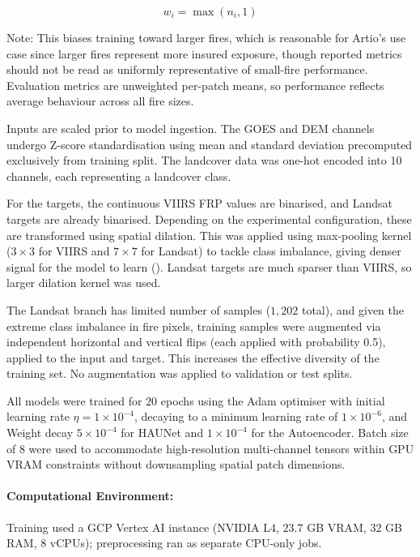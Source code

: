 \documentclass[a4paper, 11pt]{article} %
\begin{document}
\begin{equation}\label{eq:weighted_sampling}
    w_i = \max(n_i, 1)
\end{equation}

Note: This biases training toward larger fires, which is reasonable for Artio's use case since larger fires represent more insured exposure, though reported metrics should not be read as uniformly representative of small-fire performance. Evaluation metrics are unweighted per-patch means, so performance reflects average behaviour across all fire sizes.

Inputs are scaled prior to model ingestion. The GOES and DEM channels undergo Z-score standardisation using mean and standard deviation precomputed exclusively from training split. The landcover data was one-hot encoded into 10 channels, each representing a landcover class.

For the targets, the continuous VIIRS FRP values are binarised, and Landsat targets are already binarised. Depending on the experimental configuration, these are transformed using spatial dilation. This was applied using max-pooling kernel ($3 \times 3$ for VIIRS and $7 \times 7$ for Landsat) to tackle class imbalance, giving denser signal for the model to learn (\cite{wangFocalDiceLoss2018}). Landsat targets are much sparser than VIIRS, so larger dilation kernel was used.

The Landsat branch has limited number of samples ($1,202$ total), and given the extreme class imbalance in fire pixels, training samples were augmented via independent horizontal and vertical flips (each applied with probability 0.5), applied to the input and target. This increases the effective diversity of the training set. No augmentation was applied to validation or test splits.

All models were trained for $20$ epochs using the Adam optimiser with initial learning rate $\eta = 1 \times 10^{-4}$, decaying to a minimum learning rate of $1 \times 10^{-6}$, and Weight decay $5 \times 10^{-4}$ for HAUNet and $1 \times 10^{-4}$ for the Autoencoder. Batch size of $8$ were used to accommodate high-resolution multi-channel tensors within GPU VRAM constraints without downsampling spatial patch dimensions.

\paragraph{Computational Environment:} Training used a GCP Vertex AI instance (NVIDIA L4, $23.7$ GB VRAM, $32$ GB RAM, $8$ vCPUs); preprocessing ran as separate CPU-only jobs.
\end{document}
